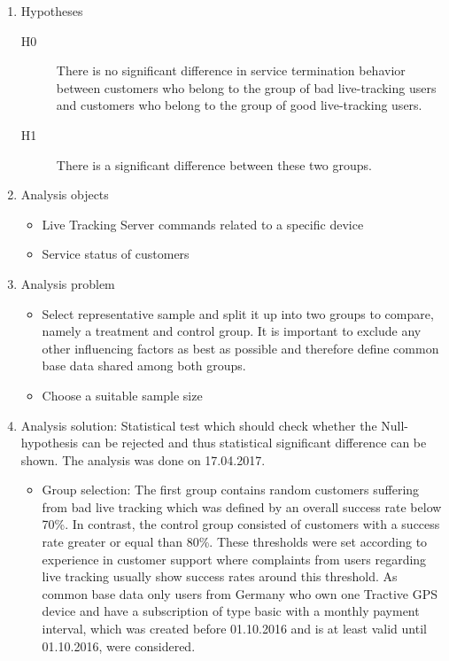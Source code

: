 \begin{enumerate}
	\item Hypotheses
	\begin{description}
		\item[H0] There is no significant difference in service termination behavior between customers who belong to the group of bad live-tracking users and customers who belong to the group of good live-tracking users.
		\item[H1] There is a significant difference between these two groups.
	\end{description}
	\item Analysis objects
	\begin{itemize}
		\item Live Tracking Server commands related to a specific device
		\item Service status of customers
	\end{itemize}
	\item Analysis problem
	\begin{itemize}
		\item Select representative sample and split it up into two groups to compare, namely a treatment and control group. It is important to exclude any other influencing factors as best as possible and therefore define common base data shared among both groups. 
		\item Choose a suitable sample size
	\end{itemize}
	\item Analysis solution: Statistical test which should check whether the Null-hypothesis can be rejected and thus statistical significant difference can be shown. The analysis was done on 17.04.2017. 
	\begin{itemize}
		\item Group selection: The first group contains random customers suffering from bad live tracking which was defined by an overall success rate below 70\%. In contrast, the control group consisted of customers with a success rate greater or equal than 80\%. These thresholds were set according to experience in customer support where complaints from users regarding live tracking usually show success rates around this threshold. As common base data only users from Germany who own one Tractive GPS device and have a subscription of type basic with a monthly payment interval, which was created before 01.10.2016 and is at least valid until 01.10.2016, were considered. 

\end{itemize}
\end{enumerate}
